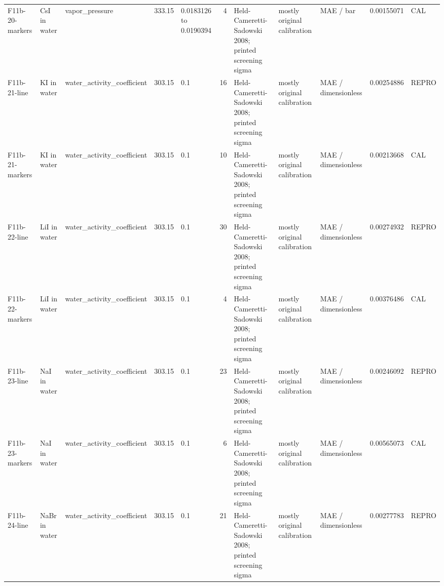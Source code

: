 \begin{landscape}
\begin{longtable}{L{1.9cm}L{2.5cm}L{2.1cm}L{1.6cm}L{1.6cm}rL{2.4cm}L{1.9cm}L{2.2cm}rL{1cm}}
F11b-\allowbreak{}20-\allowbreak{}markers & CsI in water & vapor\_\allowbreak{}pressure & 333.15 & 0.0183126 to 0.0190394 & 4 & Held-\allowbreak{}Cameretti-\allowbreak{}Sadowski 2008; printed screening sigma & mostly original calibration & MAE /\allowbreak{} bar & 0.00155071 & CAL \\
F11b-\allowbreak{}21-\allowbreak{}line & KI in water & water\_\allowbreak{}activity\_\allowbreak{}coefficient & 303.15 & 0.1 & 16 & Held-\allowbreak{}Cameretti-\allowbreak{}Sadowski 2008; printed screening sigma & mostly original calibration & MAE /\allowbreak{} dimensionless & 0.00254886 & REPRO \\
F11b-\allowbreak{}21-\allowbreak{}markers & KI in water & water\_\allowbreak{}activity\_\allowbreak{}coefficient & 303.15 & 0.1 & 10 & Held-\allowbreak{}Cameretti-\allowbreak{}Sadowski 2008; printed screening sigma & mostly original calibration & MAE /\allowbreak{} dimensionless & 0.00213668 & CAL \\
F11b-\allowbreak{}22-\allowbreak{}line & LiI in water & water\_\allowbreak{}activity\_\allowbreak{}coefficient & 303.15 & 0.1 & 30 & Held-\allowbreak{}Cameretti-\allowbreak{}Sadowski 2008; printed screening sigma & mostly original calibration & MAE /\allowbreak{} dimensionless & 0.00274932 & REPRO \\
F11b-\allowbreak{}22-\allowbreak{}markers & LiI in water & water\_\allowbreak{}activity\_\allowbreak{}coefficient & 303.15 & 0.1 & 4 & Held-\allowbreak{}Cameretti-\allowbreak{}Sadowski 2008; printed screening sigma & mostly original calibration & MAE /\allowbreak{} dimensionless & 0.00376486 & CAL \\
F11b-\allowbreak{}23-\allowbreak{}line & NaI in water & water\_\allowbreak{}activity\_\allowbreak{}coefficient & 303.15 & 0.1 & 23 & Held-\allowbreak{}Cameretti-\allowbreak{}Sadowski 2008; printed screening sigma & mostly original calibration & MAE /\allowbreak{} dimensionless & 0.00246092 & REPRO \\
F11b-\allowbreak{}23-\allowbreak{}markers & NaI in water & water\_\allowbreak{}activity\_\allowbreak{}coefficient & 303.15 & 0.1 & 6 & Held-\allowbreak{}Cameretti-\allowbreak{}Sadowski 2008; printed screening sigma & mostly original calibration & MAE /\allowbreak{} dimensionless & 0.00565073 & CAL \\
F11b-\allowbreak{}24-\allowbreak{}line & NaBr in water & water\_\allowbreak{}activity\_\allowbreak{}coefficient & 303.15 & 0.1 & 21 & Held-\allowbreak{}Cameretti-\allowbreak{}Sadowski 2008; printed screening sigma & mostly original calibration & MAE /\allowbreak{} dimensionless & 0.00277783 & REPRO \\

\end{longtable}
\end{landscape}
